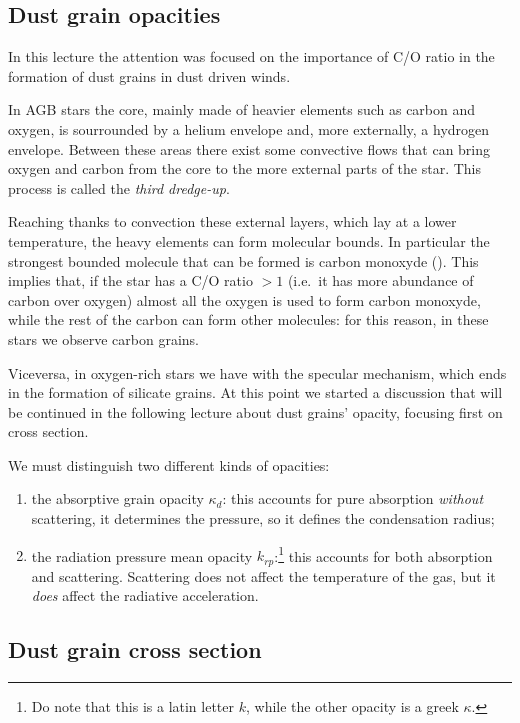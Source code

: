 \documentclass[main.tex]{subfiles}
\begin{document}
\subsection{Dust grain opacities}

In this lecture the attention was focused on the importance of C/O ratio in the formation of dust grains in dust driven winds. 

In AGB stars the core, mainly made of heavier elements such as carbon and oxygen, is sourrounded by a helium envelope and, more externally, a hydrogen envelope. 
Between these areas there exist some convective flows that can bring oxygen and carbon from the core to the more external parts of the star. 
This process is called the \emph{third dredge-up}.

Reaching thanks to convection these external layers, which lay at a lower temperature, the heavy elements can form molecular bounds.
In particular the strongest bounded molecule that can be formed is carbon monoxyde ().
This implies that, if the star has a C/O ratio $>1$ (i.e.\ it has more abundance of carbon over oxygen) almost all the oxygen is used to form carbon monoxyde, while the rest of the carbon can form other molecules: for this reason, in these stars we observe carbon grains.

Viceversa, in oxygen-rich stars we have with the specular mechanism, which ends in the formation of silicate grains.
At this point we started a discussion that will be continued in the following lecture about dust grains' opacity, focusing first on cross section.

We must distinguish two different kinds of opacities: 
\begin{enumerate}
  \item the absorptive grain opacity \(\kappa_{d}\): this accounts for pure absorption \emph{without} scattering, it determines the pressure, so it defines the condensation radius;
  \item the radiation pressure mean opacity \(k_{rp}\):\footnote{Do note that this is a latin letter \(k\), while the other opacity is a greek \(\kappa \).} this accounts for both absorption and scattering. Scattering does not affect the temperature of the gas, but it \emph{does} affect the radiative acceleration.
\end{enumerate}

\subsection{Dust grain cross section}
\end{document}
